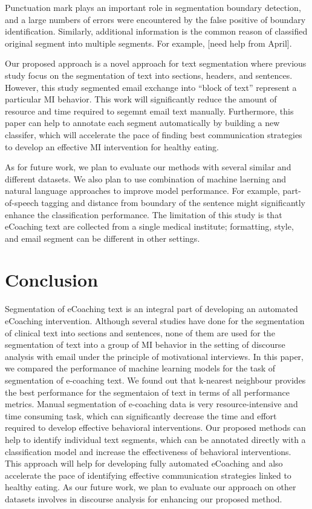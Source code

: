 \documentclass{amia}
\begin{document}
Punctuation mark plays an important role in segmentation boundary detection, and a large numbers of errors were encountered by the false positive of boundary identification. Similarly, additional information is the common reason of classified original segment into multiple segments. For example, [need help from April].

Our proposed approach is a novel approach for text segmentation where previous study focus on the segmentation of text into sections, headers, and sentences. However, this study segmented email exchange into ``block of text'' represent a particular MI behavior. This work will significantly reduce the amount of resource and time required to segemnt email text manually. Furthermore, this paper can help to annotate each segment automatically by building a new classifer, which will accelerate the pace of finding best communication strategies to develop an effective MI intervention for healthy eating.

As for future work, we plan to evaluate our methods with several similar and different datasets. We also plan to use combination of machine laerning and natural language approaches to improve model performance. For example, part-of-speech tagging and distance from boundary of the sentence might significantly enhance the classification performance. The limitation of this study is that eCoaching text are collected from a single medical institute; formatting, style, and email segment can be different in other settings.
 
\section*{Conclusion}
Segmentation of eCoaching text is an integral part of developing an automated eCoaching intervention. Although several studies have done for the segmentation of clinical text into sections and sentences, none of them are used for the segmentation of text into a group of MI behavior in the setting of discourse analysis with email under the principle of motivational interviews. In this paper, we compared the performance of machine learning models for the task of segmentation of e-coaching text. We found out that k-nearest neighbour provides the best performance for the segmentaion of text in terms of all performance metrics. Manual segmentation of e-coaching data is very resource-intensive and time consuming task, which can significantly decrease the time and effort required to develop effective behavioral interventions. Our proposed methods can help to identify individual text segments, which can be annotated directly with a classification model and increase the effectiveness of behavioral interventions. This approach will help for developing fully automated eCoaching and also accelerate the pace of identifying effective communication strategies linked to healthy eating. As our future work, we plan to evaluate our approach on other datasets involves in discourse analysis for enhancing our proposed method.  
\end{document}
